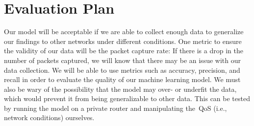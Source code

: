 \section{Evaluation Plan}\label{evaluation}
    Our model will be acceptable if we are able to collect enough data to generalize our findings to other networks under different conditions. One metric to ensure the validity of our data will be the packet capture rate: If there is a drop in the number of packets captured, we will know that there may be an issue with our data collection. We will be able to use metrics such as accuracy, precision, and recall in order to evaluate the quality of our machine learning model. We must also be wary of the possibility that the model may over- or underfit the data, which would prevent it from being generalizable to other data. This can be tested by running the model on a private router and manipulating the~QoS (i.e., network conditions) ourselves.

